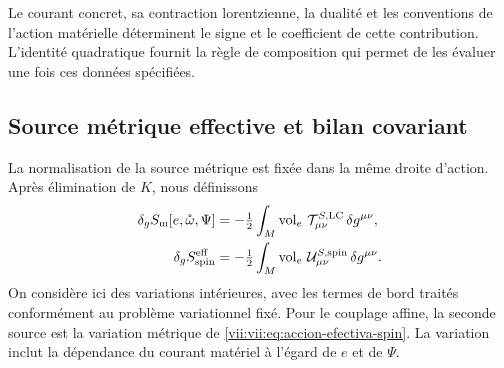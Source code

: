 Le courant concret, sa contraction lorentzienne, la dualité et les
conventions de l'action matérielle déterminent le signe et le coefficient
de cette contribution. L'identité quadratique fournit la règle de
composition qui permet de les évaluer une fois ces données spécifiées.

\subsection{Source métrique effective et bilan covariant}
\label{vii:vii:subsec:fuente-metrica-efectiva}

La normalisation de la source métrique est fixée dans la même droite d'action. Après élimination de \(K\), nous définissons
\begin{align}
 \delta_g S_{\rm m}[e,\mathring\omega,\Psi]
 &=-\tfrac12\int_M\operatorname{vol}_e\,
                   \mathcal T^{S,\rm LC}_{\mu\nu}\,\delta g^{\mu\nu},
 \\
 \delta_g S_{\rm spin}^{\rm eff}
 &=-\tfrac12\int_M\operatorname{vol}_e\,
                   \mathcal U^{S,\rm spin}_{\mu\nu}\,\delta g^{\mu\nu}.
 \label{vii:vii:eq:fuentes-normalizadas-accion}
\end{align}
On considère ici des variations intérieures, avec les termes de bord
traités conformément au problème variationnel fixé. Pour le couplage
affine, la seconde source est la variation métrique de
\eqref{vii:vii:eq:accion-efectiva-spin}. La variation inclut la dépendance
du courant matériel à l'égard de \(e\) et de \(\Psi\).

